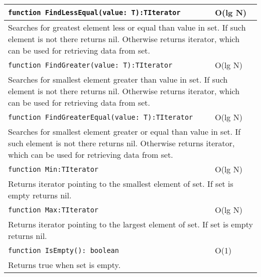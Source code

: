 \begin{longtable}{|m{10cm}|m{5cm}|}
\verb!function FindLessEqual(value: T):TIterator! & O(lg N) \\\hline
\multicolumn{2}{|m{15cm}|}{Searches for greatest element less or equal than value in set. If such element is not there returns nil. Otherwise
returns iterator, which can be used for retrieving data from set.} \\\hline\hline

\verb!function FindGreater(value: T):TIterator! & O(lg N) \\\hline
\multicolumn{2}{|m{15cm}|}{Searches for smallest element greater than value in set. If such element is not there returns nil. Otherwise
returns iterator, which can be used for retrieving data from set.} \\\hline\hline

\verb!function FindGreaterEqual(value: T):TIterator! & O(lg N) \\\hline
\multicolumn{2}{|m{15cm}|}{Searches for smallest element greater or equal than value in set. If such element is not there returns nil. Otherwise
returns iterator, which can be used for retrieving data from set.} \\\hline\hline

\verb!function Min:TIterator! & O(lg N) \\\hline
\multicolumn{2}{|m{15cm}|}{Returns iterator pointing to the smallest element of set. If set is empty returns
nil.} \\\hline\hline

\verb!function Max:TIterator! & O(lg N) \\\hline
\multicolumn{2}{|m{15cm}|}{Returns iterator pointing to the largest element of set. If set is empty returns
nil.} \\\hline\hline

\verb!function IsEmpty(): boolean! & O(1) \\ \hline
\multicolumn{2}{|m{15cm}|}{Returns true when set is empty.} \\\hline

\end{longtable}

